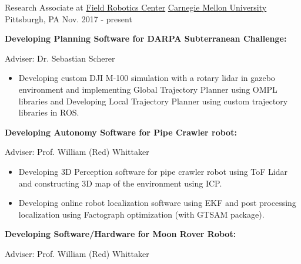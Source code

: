 



\begin{cventries}







  \cventry
    {Research Associate at \href{https://www.frc.ri.cmu.edu/}{Field Robotics Center}} %
    {\href{https://www.ri.cmu.edu/}{Carnegie Mellon University}} %
    {Pittsburgh, PA} %
    {Nov. 2017 - present} %
    {
      \begin{cvitems} %
      	\item \textbf{Developing Planning Software for DARPA Subterranean Challenge:} \begin{flushright} {\color{awesome} Adviser: Dr. Sebastian Scherer} \end{flushright}
		\begin{itemize}
			\item Developing custom DJI M-100 simulation with a rotary lidar in gazebo environment and implementing Global Trajectory Planner using OMPL libraries and Developing Local Trajectory Planner using custom trajectory libraries in ROS.
		\end{itemize}	
		\item \textbf{Developing Autonomy Software for Pipe Crawler robot:} \begin{flushright} {\color{awesome} Adviser: Prof. William (Red) Whittaker} \end{flushright}
		\begin{itemize}
			\item Developing 3D Perception software for pipe crawler robot using ToF Lidar and constructing 3D map of the environment using ICP.
			\item Developing online robot localization software using EKF and post processing localization using Factograph optimization (with GTSAM package).
		\end{itemize}
		\item \textbf{Developing Software/Hardware for Moon Rover Robot:} \begin{flushright} {\color{awesome} Adviser: Prof. William (Red) Whittaker} \end{flushright}

\end{cvitems}}
\end{cventries}
